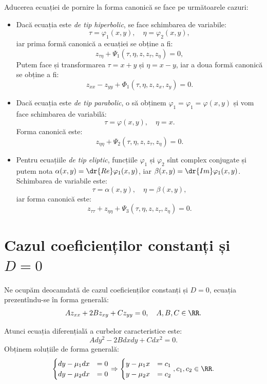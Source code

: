 Aducerea ecuației de pornire la forma canonică se face pe următoarele cazuri:
\begin{itemize}
    \item Dacă ecuația este \emph{de tip hiperbolic}, se face schimbarea de variabile:
        \[
            \tau = \varphi_1(x, y), \quad \eta = \varphi_2(x, y),
        \]
        iar prima formă canonică a ecuației se obține a fi:
        \[
            z_{\tau\eta} + \Psi_1(\tau, \eta, z, z_\tau, z_\eta) = 0,
        \]
        Putem face și transformarea $ \tau = x + y $ și $ \eta = x - y $, iar a doua
        formă canonică se obține a fi:
        \[
            z_{xx} - z_{yy} + \Phi_1(\tau, \eta, z, z_x, z_y) = 0.
        \]
    \item Dacă ecuația este \emph{de tip parabolic}, o să obținem
        $ \varphi_1 = \varphi_1 = \varphi(x, y) $ și vom face schimbarea de variabilă:
        \[
            \tau = \varphi(x, y), \quad \eta = x.
        \]
        Forma canonică este:
        \[
            z_{\eta\eta} + \Psi_2(\tau, \eta, z, z_\tau, z_\eta) = 0.
        \]
    \item Pentru ecuațiile \emph{de tip eliptic}, funcțiile $ \varphi_1 $ și $ \varphi_2 $
        sînt complex conjugate și putem nota $ \alpha(x, y) = \dr{Re} \varphi_1(x, y) $,
        iar $ \beta(x, y) = \dr{Im}\varphi_1(x, y) $. Schimbarea de variabile este:
        \[
            \tau = \alpha(x, y), \quad \eta = \beta(x, y),
        \]
        iar forma canonică este:
        \[
            z_{\tau\tau} + z_{\eta\eta} + \Psi_3(\tau, \eta, z, z_\tau, z_\eta) = 0.
        \]
\end{itemize}

\section{Cazul coeficienților constanți și $D = 0$}
\label{sec:coef-ct-d0}

Ne ocupăm deocamdată de cazul coeficienților constanți și $ D = 0 $, ecuația prezentîndu-se
în forma generală:
\[
    A z_{xx} + 2B z_{xy} + C z_{yy} = 0, \quad A, B, C \in \RR.
\]

Atunci ecuația diferențială a curbelor caracteristice este:
\[
    Ady^2 - 2Bdxdy + Cdx^2 = 0.
\]
Obținem soluțiile de forma generală:
\[
    \begin{cases}
        dy - \mu_1 dx &= 0 \\
        dy - \mu_2 dx &= 0
    \end{cases} \Rightarrow
    \begin{cases}
        y - \mu_1 x &= c_1 \\
        y - \mu_2 x &= c_2
    \end{cases}, c_1, c_2 \in \RR.
\]

